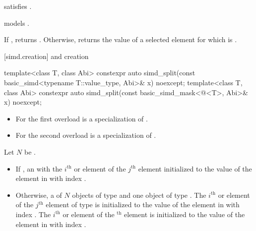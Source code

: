 \begin{itemdescr}
  \pnum\constraints
   satisfies .

  \pnum\expects
   models .

  \pnum\returns
  If , returns .
  Otherwise, returns the value of a selected element  for which  is  \forallmaskedi.
\end{itemdescr}

[simd.creation]{ and  creation}

\begin{itemdecl}
template<class T, class Abi>
  constexpr auto simd_split(const basic_simd<typename T::value_type, Abi>& x) noexcept;
template<class T, class Abi>
  constexpr auto simd_split(const basic_simd_mask<@\maskelementsize@<T>, Abi>& x) noexcept;
\end{itemdecl}

\begin{itemdescr}

  \pnum\constraints
  \begin{itemize}
    \item For the first overload  is a specialization of .
    \item For the second overload  is a specialization of .
  \end{itemize}

  \pnum Let $N$ be .

    \pnum\returns
    \begin{itemize}
      \item If , an  with
        the $i^\text{th}$ \simd or \mask element of the $j^\text{th}$ 
        element initialized to the value of the element in  with index
        .

      \item Otherwise, a  of $N$ objects of type  and one
        object of type .
        The $i^\text{th}$ \simd or \mask element of the $j^\text{th}$
         element of type  is initialized to the value of
        the element in  with index .
        The $i^\text{th}$ \simd or \mask element of the $^\text{th}$
         element is initialized to the value of the element in
         with index .
    \end{itemize}
  \end{itemdescr}

